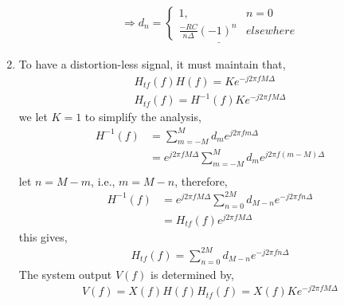 \documentclass[11pt]{article}
\begin{document}
\begin{enumerate}[label=(\alph*)]
\begin{align*}
\Rightarrow \underline{d_n=\left\{
             \begin{array}{lr}
             1, & n=0\\
             \frac{ -RC }{ n\Delta}(-1)^n & elsewhere
             \end{array}
\right. }
\end{align*}
\item %
To have a distortion-less signal, it must maintain that,
\begin{align*}
    H_{tf}(f)H(f)=Ke^{-j 2 \pi f M \Delta} \\
    H_{tf}(f)=H^{-1}(f)Ke^{-j2 \pi f M \Delta}
\end{align*}
we let $K=1$ to simplify the analysis,
\begin{align*}
    H^{-1}(f) &= \sum ^{M}_{m=-M} d_m e^{j2\pi fm \Delta}\\
    &=e^{j2\pi fM \Delta} \sum ^{M}_{m=-M} d_m e^{j2\pi f(m-M) \Delta}\\
\end{align*}
let $n=M-m$, i.e., $m=M-n$, therefore,
\begin{align*}
H^{-1}(f) &=e^{j2\pi fM \Delta} \sum ^{2M}_{n=0} d_{M-n} e^{-j2\pi fn \Delta}\\
&= H_{tf}(f)e^{j 2\pi f M \Delta}
\end{align*}
this gives,
\begin{align*}
H_{tf}(f)=\sum ^{2M}_{n=0} d_{M-n} e^{-j2\pi fn \Delta}
\end{align*}
The system output $V(f)$ is determined by,
\begin{align*}
V(f)=X(f)H(f)H_{tf}(f)=X(f)Ke^{-j2 \pi f M \Delta}
\end{align*}

\end{enumerate}
\end{document}
